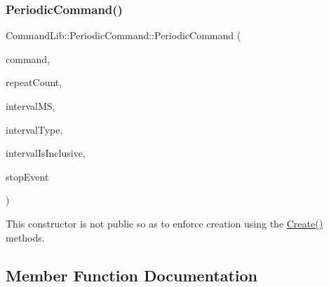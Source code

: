 \subsubsection{\texorpdfstring{Periodic\+Command()}{PeriodicCommand()}}
{\footnotesize\ttfamily Command\+Lib\+::\+Periodic\+Command\+::\+Periodic\+Command (\begin{DoxyParamCaption}\item[{\mbox{\hyperlink{class_command_lib_1_1_command_a3b3e4f00144373299df5c6bb1acc319d}{Command\+::\+Ptr}}}]{command,  }\item[{size\+\_\+t}]{repeat\+Count,  }\item[{long long}]{interval\+MS,  }\item[{\mbox{\hyperlink{class_command_lib_1_1_periodic_command_ac32ef93cf679cd652da30a0ad373d31e}{Interval\+Type}}}]{interval\+Type,  }\item[{bool}]{interval\+Is\+Inclusive,  }\item[{\mbox{\hyperlink{class_command_lib_1_1_waitable_ac74b6b91e48220146eada76a31cf2d9b}{Waitable\+::\+Ptr}}}]{stop\+Event }\end{DoxyParamCaption})\hspace{0.3cm}{\ttfamily [protected]}}



This constructor is not public so as to enforce creation using the \mbox{\hyperlink{class_command_lib_1_1_periodic_command_aa553fa62e0e5774b39c1105caf3dd087}{Create()}} methods. 



\subsection{Member Function Documentation}
\mbox{\label{class_command_lib_1_1_periodic_command_aa553fa62e0e5774b39c1105caf3dd087}} 
